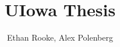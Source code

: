 \documentclass{ltxdoc}
\begin{document}
  \title{UIowa Thesis}
  \author{Ethan Rooke, Alex Polenberg}
  \maketitle
\end{document}
